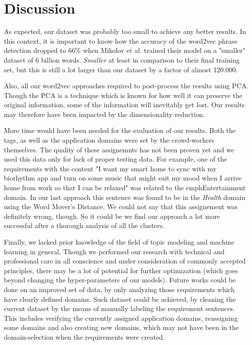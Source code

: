 \section{Discussion}
\label{sec:discussion}
As expected, our dataset was probably too small to achieve any better results. In this context, it is important to know how the accuracy of the word2vec phrase detection dropped to 66\% when Mikolov et al. trained their model on a "smaller" dataset of 6 billion words\cite[p7]{mikolov_distributed_2013}. \emph{Smaller} at least in comparison to their final training set, but this is still a lot larger than our dataset by a factor of almost 120.000.

Also, all our word2vec approaches required to post-process the results using PCA. Though the PCA is a technique which is known for how well it can preserve the original information, some of the information will inevitably get lost. Our results may therefore have been impacted by the dimensionality reduction.

More time would have been needed for the evaluation of our results. Both the tags, as well as the application domains were set by the crowd-workers themselves. The quality of these assignemnts has not been proven yet and we used this data only for lack of proper testing data. For example, one of the requirements with the content "I want my smart home to sync with my biorhythm app and turn on some music that might suit my mood when I arrive home from work so that I can be relaxed" was related to the emph{Entertainment} domain. In our last approach this sentence was found to be in the \emph{Health} domain using the Word Mover's Distance. We could not say that this assignement was definitely wrong, though. So it could be we find our approach a lot more successful after a thorough analysis of all the clusters.

Finally, we lacked prior knowledge of the field of topic modeling and machine learning in general. Though we performed our research with technical and professional care in all conscience and under consideration of commonly accepted principles, there may be a lot of potential for further optimization (which goes beyond changing the hyper-parameters of our models). Future works could be done on an improved set of data, by only analyzing those requirements which have clearly defined domains. Such dataset could be achieved, by cleaning the current \crowdre{} dataset by the means of manually labeling the requirement sentences. This includes verifying the currently assigned application domains, reassigning some domains and also creating new domains, which may not have been in the domain-selection when the requirements were created.\\[2cm]